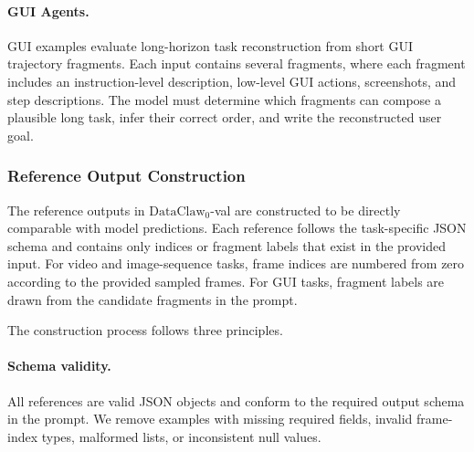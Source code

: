 \documentclass{llmxive}
\begin{document}
\paragraph{GUI Agents.}
GUI examples evaluate long-horizon task reconstruction from short GUI trajectory fragments. Each input contains several fragments, where each fragment includes an instruction-level description, low-level GUI actions, screenshots, and step descriptions. The model must determine which fragments can compose a plausible long task, infer their correct order, and write the reconstructed user goal. 

\subsubsection{Reference Output Construction}
\label{app:reference_output_construction}

The reference outputs in $\text{DataClaw}_0$-val are constructed to be directly comparable with model predictions. Each reference follows the task-specific JSON schema and contains only indices or fragment labels that exist in the provided input. For video and image-sequence tasks, frame indices are numbered from zero according to the provided sampled frames. For GUI tasks, fragment labels are drawn from the candidate fragments in the prompt.

The construction process follows three principles.

\paragraph{Schema validity.}
All references are valid JSON objects and conform to the required output schema in the prompt. We remove examples with missing required fields, invalid frame-index types, malformed lists, or inconsistent null values.

\end{document}

